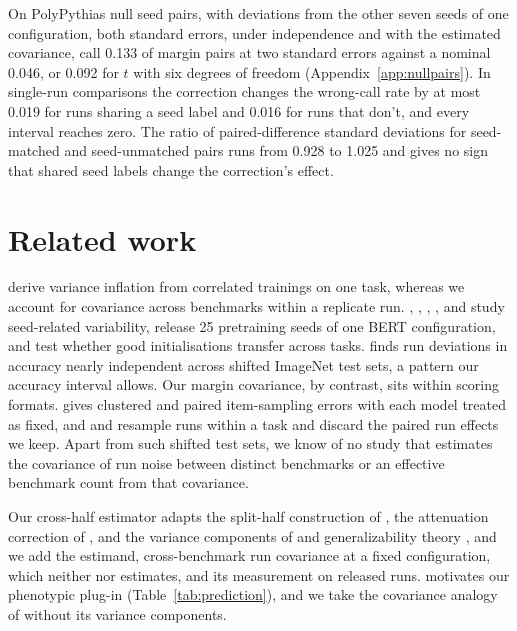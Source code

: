 \documentclass{article}
\begin{document}
On PolyPythias null seed pairs, with deviations from the other seven seeds of one configuration, both standard errors, under independence and with the estimated covariance, call 0.133 of margin pairs at two standard errors against a nominal 0.046, or 0.092 for $t$ with six degrees of freedom (Appendix~\ref{app:nullpairs}). In single-run comparisons the correction changes the wrong-call rate by at most 0.019 for runs sharing a seed label and 0.016 for runs that don't, and every interval reaches zero. The ratio of paired-difference standard deviations for seed-matched and seed-unmatched pairs runs from 0.928 to 1.025 and gives no sign that shared seed labels change the correction's effect.


\section{Related work}
\citet{bouthillier2021} derive variance inflation from correlated trainings on one task, whereas we account for covariance across benchmarks within a replicate run. \citet{reimers2017}, \citet{zhou2020}, \citet{summers2021}, \citet{madaan2024}, and \citet{fehlauer2025} study seed-related variability, \citet{sellam2022} release 25 pretraining seeds of one BERT configuration, and \citet{dodge2020} test whether good initialisations transfer across tasks. \citet{jordan2024} finds run deviations in accuracy nearly independent across shifted ImageNet test sets, a pattern our accuracy interval allows. Our margin covariance, by contrast, sits within scoring formats. \citet{miller2024} gives clustered and paired item-sampling errors with each model treated as fixed, and \citet{henderson2018} and \citet{agarwal2021} resample runs within a task and discard the paired run effects we keep. Apart from such shifted test sets, we know of no study that estimates the covariance of run noise between distinct benchmarks or an effective benchmark count from that covariance.

Our cross-half estimator adapts the split-half construction of \citet{spearman1910,brown1910}, the attenuation correction of \citet{spearman1904}, and the variance components of \citet{searle1992} and generalizability theory \citep{brennan2001}, and we add the estimand, cross-benchmark run covariance at a fixed configuration, which neither \citet{miller2024} nor \citet{heineman2025} estimates, and its measurement on released runs. \citet{cheverud1988} motivates our phenotypic plug-in (Table~\ref{tab:prediction}), and we take the covariance analogy of \citet{martin1977} without its variance components.
\end{document}
